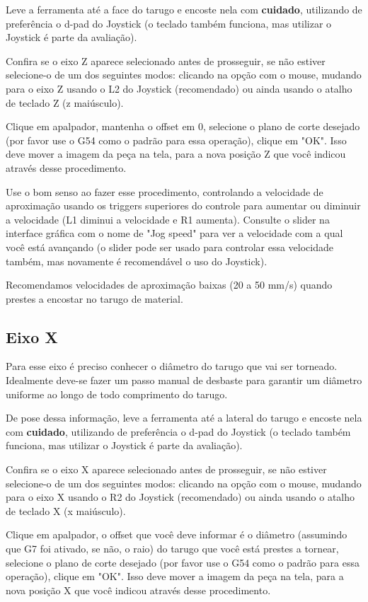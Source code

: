 \documentclass[twoside,a4paper]{refart}
\begin{document}
Leve a ferramenta até a face do tarugo e encoste nela com \textbf{cuidado}, utilizando de preferência o d-pad do Joystick (o teclado também funciona, mas utilizar o Joystick é parte da avaliação). 

Confira se o eixo Z aparece selecionado antes de prosseguir, se não estiver selecione-o de um dos seguintes modos: clicando na opção com o mouse, mudando para o eixo Z usando o L2 do Joystick (recomendado) ou ainda usando o atalho de teclado Z (z maiúsculo).

Clique em apalpador, mantenha o offset em 0, selecione o plano de corte desejado (por favor use o G54 como o padrão para essa operação), clique em "OK". Isso deve mover a imagem da peça na tela, para a nova posição Z que você indicou através desse procedimento.

\attention Use o bom senso ao fazer esse procedimento, controlando a velocidade de aproximação usando os triggers superiores do controle para aumentar ou diminuir a velocidade (L1 diminui a velocidade e R1 aumenta). Consulte o slider na interface gráfica com o nome de "Jog speed" para ver a velocidade com a qual você está avançando (o slider pode ser usado para controlar essa velocidade também, mas novamente é recomendável o uso do Joystick). 

\attention Recomendamos velocidades de aproximação baixas (20 a 50 mm/s) quando prestes a encostar no tarugo de material.

\subsection{Eixo X}

Para esse eixo é preciso conhecer o diâmetro do tarugo que vai ser torneado. Idealmente deve-se fazer um passo manual de desbaste para garantir um diâmetro uniforme ao longo de todo comprimento do tarugo.

De pose dessa informação, leve a ferramenta até a lateral do tarugo e encoste nela com \textbf{cuidado}, utilizando de preferência o d-pad do Joystick (o teclado também funciona, mas utilizar o Joystick é parte da avaliação). 

Confira se o eixo X aparece selecionado antes de prosseguir, se não estiver selecione-o de um dos seguintes modos: clicando na opção com o mouse, mudando para o eixo X usando o R2 do Joystick (recomendado) ou ainda usando o atalho de teclado X (x maiúsculo).

Clique em apalpador, o offset que você deve informar é o diâmetro (assumindo que G7 foi ativado, se não, o raio) do tarugo que você está prestes a tornear, selecione o plano de corte desejado (por favor use o G54 como o padrão para essa operação), clique em "OK". Isso deve mover a imagem da peça na tela, para a nova posição X que você indicou através desse procedimento.
\end{document}

